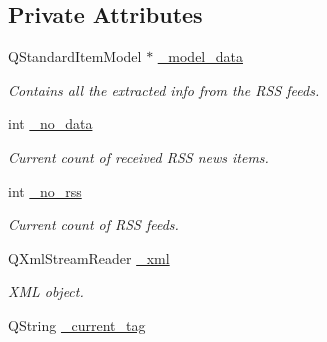 \subsection*{Private Attributes}
\begin{DoxyCompactItemize}
\item 
\hypertarget{class_rss_client_ab7a26f3940ef8106cb3cfd81f2e37635}{Q\+Standard\+Item\+Model $\ast$ \hyperlink{class_rss_client_ab7a26f3940ef8106cb3cfd81f2e37635}{\+\_\+model\+\_\+data}}\label{class_rss_client_ab7a26f3940ef8106cb3cfd81f2e37635}

\begin{DoxyCompactList}\small\item\em Contains all the extracted info from the R\+S\+S feeds. \end{DoxyCompactList}\item 
\hypertarget{class_rss_client_a1a302e544e60a4c6d87b780baf5aa44b}{int \hyperlink{class_rss_client_a1a302e544e60a4c6d87b780baf5aa44b}{\+\_\+no\+\_\+data}}\label{class_rss_client_a1a302e544e60a4c6d87b780baf5aa44b}

\begin{DoxyCompactList}\small\item\em Current count of received R\+S\+S news items. \end{DoxyCompactList}\item 
\hypertarget{class_rss_client_ae6ae07ab3ed73a6a58ec4d7aad37fa74}{int \hyperlink{class_rss_client_ae6ae07ab3ed73a6a58ec4d7aad37fa74}{\+\_\+no\+\_\+rss}}\label{class_rss_client_ae6ae07ab3ed73a6a58ec4d7aad37fa74}

\begin{DoxyCompactList}\small\item\em Current count of R\+S\+S feeds. \end{DoxyCompactList}\item 
\hypertarget{class_rss_client_a22dedd159a3374efc3bed38a296b98cc}{Q\+Xml\+Stream\+Reader \hyperlink{class_rss_client_a22dedd159a3374efc3bed38a296b98cc}{\+\_\+xml}}\label{class_rss_client_a22dedd159a3374efc3bed38a296b98cc}

\begin{DoxyCompactList}\small\item\em X\+M\+L object. \end{DoxyCompactList}\item 
\hypertarget{class_rss_client_abdb6d0e6dd2b395548a4a7305a7e1d7d}{Q\+String \hyperlink{class_rss_client_abdb6d0e6dd2b395548a4a7305a7e1d7d}{\+\_\+current\+\_\+tag}}\label{class_rss_client_abdb6d0e6dd2b395548a4a7305a7e1d7d}


\end{DoxyCompactItemize}
